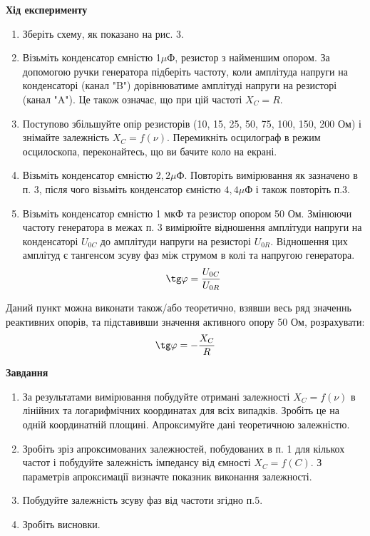 \documentclass[a4paper,12pt]{article}
\begin{document}
\newpage
    \begin{center}
		\textbf{Хід експерименту}
	\end{center}
    \begin{enumerate}
        \item Зберіть схему, як показано на рис. 3.
        \item Візьміть конденсатор ємністю 1$\mu$Ф, резистор з найменшим опором. За допомогою 
        ручки генератора підберіть частоту, коли амплітуда напруги на конденсаторі (канал "B") 
        дорівнюватиме амплітуді напруги на резисторі (канал "A"). Це також означає, що при цій частоті $X_C=R$.
        \item Поступово збільшуйте опір резисторів (10, 15, 25, 50, 75, 100, 150, 200 Ом) і 
        знімайте залежність $X_C=f(\nu)$. Перемикніть осцилограф в режим осцилоскопа, переконайтесь, що ви бачите коло на екрані.
        \item Візьміть конденсатор ємністю $2,2\mu$Ф. Повторіть вимірювання як зазначено в п. 3, 
        після чого візьміть конденсатор ємністю $4,4\mu$Ф і також повторіть п.3.
        \item Візьміть конденсатор ємністю 1 мкФ та резистор опором 50 Ом. Змінюючи 
        частоту генератора в межах п. 3 вимірюйте відношення амплітуди напруги на 
        конденсаторі $U_{0C}$ до амплітуди напруги на резисторі $U_{0R}$. Відношення цих амплітуд 
        є тангенсом зсуву фаз між струмом в колі та напругою генератора.
        $$\tg\varphi=\dfrac{U_{0C}}{U_{0R}}$$
    \end{enumerate}

    Даний пункт можна виконати також/або теоретично, взявши весь ряд значеннь 
    реактивних опорів, та підставивши значення активного опору 50 Ом, розрахувати:
    $$\tg\varphi=-\dfrac{X_C}{R}$$
    \begin{center}
		\textbf{Завдання}
	\end{center}
    \begin{enumerate}
        \item За результатами вимірювання побудуйте отримані залежності $X_C=f(\nu)$ в лінійних 
        та логарифмічних координатах для всіх випадків. Зробіть це на одній координатній площині. Апроксимуйте дані теоретичною залежністю.
        \item Зробіть зріз апроксимованих залежностей, побудованих в п. 1 для кількох частот 
        і побудуйте залежність імпедансу від ємності $X_C=f(C)$. З параметрів апроксимації 
        визначте показник виконання залежності.
        \item Побудуйте залежність зсуву фаз від частоти згідно п.5.
        \item Зробіть висновки.
    \end{enumerate}
\end{document}
